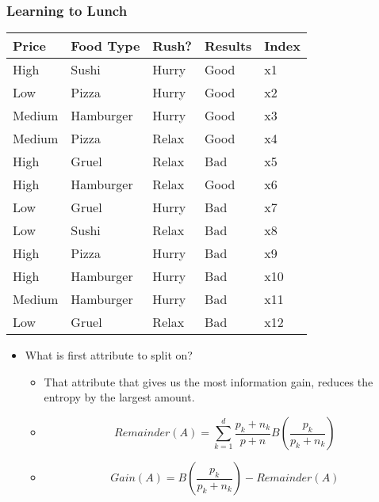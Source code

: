 \documentclass[compress, 9pt]{beamer}
\begin{document}
\begin{frame}
\frametitle{Learning to Lunch}
\label{sec-2-2}

\small

\begin{center}
\begin{tabular}{lllll}
\hline
 Price   &  Food Type  &  Rush?  &  Results  &  Index  \\
\hline
 High    &  Sushi      &  Hurry  &  Good     &  x1     \\
 Low     &  Pizza      &  Hurry  &  Good     &  x2     \\
 Medium  &  Hamburger  &  Hurry  &  Good     &  x3     \\
 Medium  &  Pizza      &  Relax  &  Good     &  x4     \\
 High    &  Gruel      &  Relax  &  Bad      &  x5     \\
 High    &  Hamburger  &  Relax  &  Good     &  x6     \\
 Low     &  Gruel      &  Hurry  &  Bad      &  x7     \\
 Low     &  Sushi      &  Relax  &  Bad      &  x8     \\
 High    &  Pizza      &  Hurry  &  Bad      &  x9     \\
 High    &  Hamburger  &  Hurry  &  Bad      &  x10    \\
 Medium  &  Hamburger  &  Hurry  &  Bad      &  x11    \\
 Low     &  Gruel      &  Relax  &  Bad      &  x12    \\
\hline
\end{tabular}
\end{center}
\begin{itemize}

\item What is first attribute to split on?
\label{sec-2-2-1}%
\begin{itemize}

\item <2-> That attribute that gives us the most information gain, reduces the entropy by the largest amount.
\label{sec-2-2-1-1}%

\item <3-> \[Remainder(A)= \sum_{k=1}^{d}\frac{p_k+n_k}{p+n}B(\frac{p_k}{p_k+n_k})\]
\label{sec-2-2-1-2}%

\item <4-> \[Gain(A) = B(\frac{p_k}{p_k+n_k}) - Remainder(A)\]
\label{sec-2-2-1-3}%
\end{itemize} %
\end{itemize} %
\end{frame}
\end{document}
